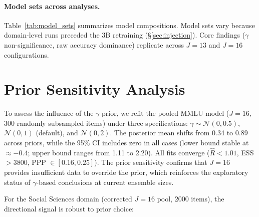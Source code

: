 \paragraph{Model sets across analyses.}
Table~\ref{tab:model_sets} summarizes model compositions. Model sets vary because domain-level runs preceded the 3B retraining (\S\ref{sec:injection}). Core findings ($\gamma$ non-significance, raw accuracy dominance) replicate across $J=13$ and $J=16$ configurations.

\begin{table}[h]
\centering
\caption{Model set composition across analyses.}
\label{tab:model_sets}
\footnotesize
{}
\end{table}

\section{Prior Sensitivity Analysis}
\label{sec:prior_sensitivity}

To assess the influence of the $\gamma$ prior, we refit the pooled MMLU model ($J=16$, 300 randomly subsampled items) under three specifications: $\gamma \sim \mathcal{N}(0, 0.5)$, $\mathcal{N}(0, 1)$ (default), and $\mathcal{N}(0, 2)$. The posterior mean shifts from 0.34 to 0.89 across priors, while the 95\% CI includes zero in all cases (lower bound stable at $\approx -0.4$; upper bound ranges from 1.11 to 2.20). All fits converge ($\hat{R} < 1.01$, ESS $> 3800$, PPP $\in [0.16, 0.25]$). The prior sensitivity confirms that $J=16$ provides insufficient data to override the prior, which reinforces the exploratory status of $\gamma$-based conclusions at current ensemble sizes.

For the Social Sciences domain (corrected $J=16$ pool, 2000 items), the directional signal is robust to prior choice:

